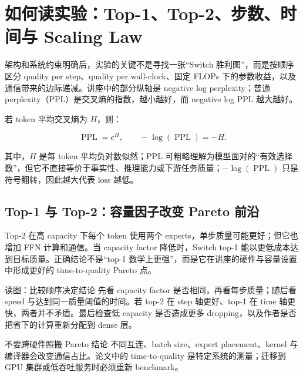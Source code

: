 \section{如何读实验：Top-1、Top-2、步数、时间与 Scaling Law}

架构和系统约束明确后，实验的关键不是寻找一张“Switch 胜利图”，而是按顺序区分 quality per step、quality per wall-clock、固定 FLOPs 下的参数收益，以及通信带来的边际递减。讲座中的部分纵轴是 negative log perplexity；普通 perplexity（PPL）是交叉熵的指数，越小越好，而 negative log PPL 越大越好。

若 token 平均交叉熵为 $H$，则：

\[
\operatorname{PPL}=e^{H},\qquad -\log(\operatorname{PPL})=-H.
\]

其中，$H$ 是每 token 平均负对数似然；PPL 可粗略理解为模型面对的“有效选择数”，但它不直接等价于事实性、推理能力或下游任务质量；$-\log(\operatorname{PPL})$ 只是符号翻转，因此越大代表 loss 越低。

\subsection{Top-1 与 Top-2：容量因子改变 Pareto 前沿}

Top-2 在高 capacity 下每个 token 使用两个 experts，单步质量可能更好；但它也增加 FFN 计算和通信。当 capacity factor 降低时，Switch top-1 能以更低成本达到目标质量。正确结论不是“top-1 数学上更强”，而是它在讲座的硬件与容量设置中形成更好的 time-to-quality Pareto 点。


\begin{knowledgebox}{读图：比较顺序决定结论}
先看 capacity factor 是否相同，再看每步质量；随后看 speed 与达到同一质量阈值的时间。若 top-2 在 step 轴更好、top-1 在 time 轴更快，两者并不矛盾。最后检查低 capacity 是否造成更多 dropping，以及作者是否把省下的计算重新分配到 dense 层。
\end{knowledgebox}


\begin{warningbox}{不要跨硬件照搬 Pareto 结论}
不同互连、batch size、expert placement、kernel 与编译器会改变通信占比。论文中的 time-to-quality 是特定系统的测量；迁移到 GPU 集群或低吞吐服务时必须重新 benchmark。
\end{warningbox}

